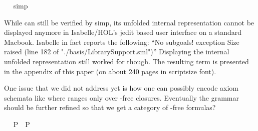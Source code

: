 \begin{isabellebody}
\isadelimproof
\ %
\endisadelimproof
%
\isatagproof
{}\isamarkupfalse%
\ simp\ \isamarkupfalse%
%
\endisatagproof
{\isafoldproof}%
%
\isadelimproof
%
\endisadelimproof
%
\isamarkuptrue%
%
\begin{isamarkuptext}%
While  can still be verified by simp, 
  its unfolded internal representation cannot be displayed anymore in Isabelle/HOL's jedit based
  user interface on a
  standard Macbook. Isabelle in fact reports the following: 
     ``No subgoals! exception Size raised (line 182 of "./basis/LibrarySupport.sml")''
   Displaying the internal unfolded representation still worked 
  for  though. The resulting term is presented in the appendix 
  of this paper (on about 240 pages in scriptsize font).%
\end{isamarkuptext}\isamarkuptrue%
%
\isamarkuptrue%
%
\begin{isamarkuptext}%
One issue that we did not address yet is how one can possibly encode 
 axiom schemata like \isa{\isactrlbold {\isasymA}{\isasymphi}\ \isactrlbold {\isasymrightarrow}\ \isactrlbold {\isasymphi}} where \isa{\isactrlbold {\isasymphi}} ranges only 
 over \isa{\isactrlbold {\isasymbox}}-free closures. Eventually the grammar should be further refined so that we get a 
 category of \isa{\isactrlbold {\isasymbox}}-free formulas?%
\end{isamarkuptext}\isamarkuptrue%
\ \isamarkupfalse%
\ {\isachardoublequoteopen}{\isacharbrackleft}\isactrlbold {\isasymA}{\isasymphi}\isactrlsup P\ \isactrlbold {\isasymrightarrow}\ \isactrlbold {\isasymbox}{\isacharparenleft}\isactrlbold {\isasymA}{\isasymphi}\isactrlsup P{\isacharparenright}{\isacharbrackright}\ {\isacharequal}\ {\isasymtop}{\isachardoublequoteclose}%

\end{isabellebody}
